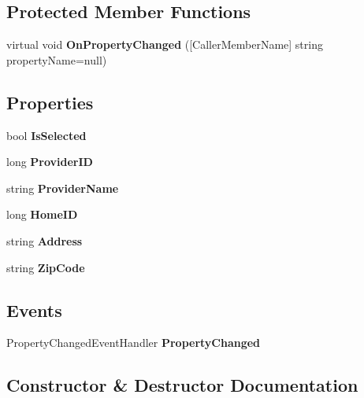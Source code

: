 \subsection*{Protected Member Functions}
\begin{DoxyCompactItemize}
\item 
virtual void \textbf{ On\+Property\+Changed} ([Caller\+Member\+Name] string property\+Name=null)
\end{DoxyCompactItemize}
\subsection*{Properties}
\begin{DoxyCompactItemize}
\item 
bool \textbf{ Is\+Selected}\hspace{0.3cm}{\ttfamily  [get, set]}
\item 
long \textbf{ Provider\+ID}\hspace{0.3cm}{\ttfamily  [get, set]}
\item 
string \textbf{ Provider\+Name}\hspace{0.3cm}{\ttfamily  [get, set]}
\item 
long \textbf{ Home\+ID}\hspace{0.3cm}{\ttfamily  [get, set]}
\item 
string \textbf{ Address}\hspace{0.3cm}{\ttfamily  [get, set]}
\item 
string \textbf{ Zip\+Code}\hspace{0.3cm}{\ttfamily  [get, set]}
\end{DoxyCompactItemize}
\subsection*{Events}
\begin{DoxyCompactItemize}
\item 
Property\+Changed\+Event\+Handler \textbf{ Property\+Changed}
\end{DoxyCompactItemize}


\subsection{Constructor \& Destructor Documentation}
\mbox{\label{class_a_f_h___scheduler_1_1_data_1_1_history_model_a917360166ea78472b07f1bd8e2f3350c}} 
